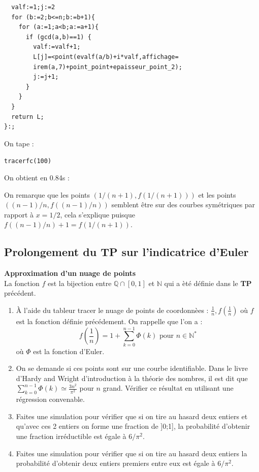 \documentclass[a4paper,11pt]{book}
\newcommand{\Q}{{\mathbb{Q}}}
\newcommand{\N}{{\mathbb{N}}}
\begin{document}
\begin{enumerate}
\begin{verbatim}
  valf:=1;j:=2
  for (b:=2;b<=n;b:=b+1){
    for (a:=1;a<b;a:=a+1){
      if (gcd(a,b)==1) {
        valf:=valf+1;
        L[j]=<point(evalf(a/b)+i*valf,affichage=
        irem(a,7)+point_point+epaisseur_point_2);
        j:=j+1;
      }
    }
  }
  return L;
}:;
\end{verbatim}
On tape :
\begin{center}{\tt tracerfc(100)}\end{center}
On obtient en 0.84s :
\begin{center}\end{center}
On remarque que les points $(1/(n+1),f(1/(n+1)))$ et les points 
$((n-1)/n,f((n-1)/n))$ semblent \^etre sur des courbes sym\'etriques par rapport
\`a $x=1/2$, cela s'explique puisque $f((n-1)/n)+1=f(1/(n+1))$.
\end{enumerate}
\subsection{Prolongement du {\bf TP} sur l'indicatrice d'Euler}
{\bf Approximation d'un nuage de points} \\
La fonction $f$ est la bijection entre $\Q \cap [0,1]$ et $\N$ qui a \`et\'e 
d\'efinie dans le {\bf TP} pr\'ec\'edent.
\begin{enumerate}
\item \`A l'aide du tableur tracer le nuage de points de coordonn\`ees :
$\displaystyle \frac{1}{n},f(\frac{1}{n})$ o\`u $f$ est la fonction d\'efinie 
pr\'ec\'edement. On rappelle que l'on a :\\
$$f(\frac{1}{n})=1+\sum_{k=0}^{n-1}\Phi(k) \mbox{ pour } n\in \N^*$$
o\`u $\Phi$ est la fonction d'Euler.
\item On se demande si ces points sont sur une courbe identifiable. Dans le 
livre d'Hardy and Wright d'introduction \`a la th\'eorie des nombres, il est 
dit que $\displaystyle \sum_{k=0}^{n-1}\Phi(k)\simeq \frac{3n^2}{\pi^2}$ pour 
$n$ grand. V\'erifier ce r\'esultat en utilisant une r\'egression convenable.
\item Faites une simulation pour v\'erifier que si on tire au hasard deux 
entiers et qu'avec ces 2 entiers on forme une fraction  de ]0;1], la 
probabilit\'e d'obtenir une fraction irr\'eductible est \'egale \`a $6/\pi^2$.
\item Faites une simulation pour v\'erifier que si on tire au hasard deux 
entiers la probabilit\'e d'obtenir deux entiers premiers entre eux est \'egale 
\`a $6/\pi^2$.
\end{enumerate}
\end{document}
